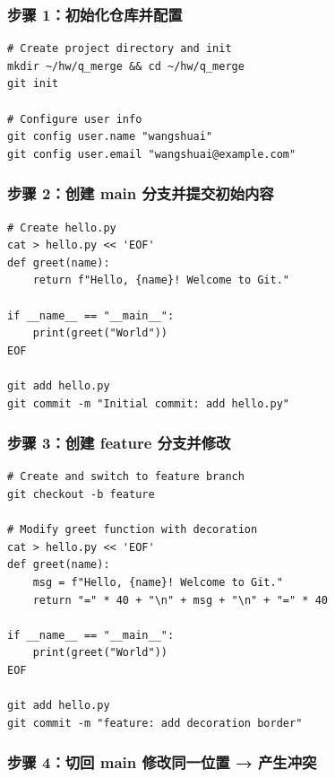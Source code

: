\documentclass[12pt,a4paper]{article}
\begin{document}
\subsubsection{步骤 1：初始化仓库并配置}

\begin{lstlisting}[style=gitstyle, caption={Initialize Git repository}]
# Create project directory and init
mkdir ~/hw/q_merge && cd ~/hw/q_merge
git init

# Configure user info
git config user.name "wangshuai"
git config user.email "wangshuai@example.com"
\end{lstlisting}

\subsubsection{步骤 2：创建 main 分支并提交初始内容}

\begin{lstlisting}[style=gitstyle, caption={Create initial commit}]
# Create hello.py
cat > hello.py << 'EOF'
def greet(name):
    return f"Hello, {name}! Welcome to Git."

if __name__ == "__main__":
    print(greet("World"))
EOF

git add hello.py
git commit -m "Initial commit: add hello.py"
\end{lstlisting}

\subsubsection{步骤 3：创建 feature 分支并修改}

\begin{lstlisting}[style=gitstyle, caption={Modify on feature branch}]
# Create and switch to feature branch
git checkout -b feature

# Modify greet function with decoration
cat > hello.py << 'EOF'
def greet(name):
    msg = f"Hello, {name}! Welcome to Git."
    return "=" * 40 + "\n" + msg + "\n" + "=" * 40

if __name__ == "__main__":
    print(greet("World"))
EOF

git add hello.py
git commit -m "feature: add decoration border"
\end{lstlisting}

\subsubsection{步骤 4：切回 main 修改同一位置 → 产生冲突}
\end{document}
